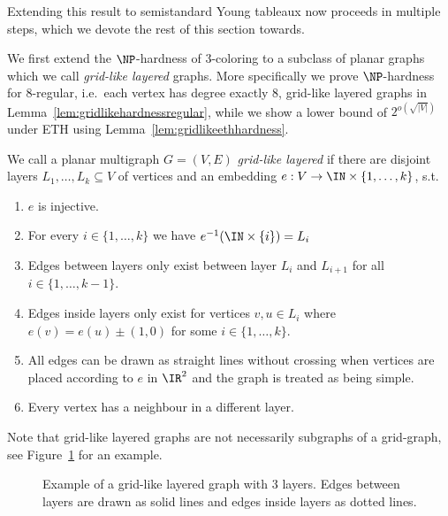 Extending this result to semistandard Young tableaux now proceeds in multiple steps, which we devote the rest of this section towards.

We first extend the $\NP$-hardness of $3$-coloring to a subclass of planar graphs which we call \emph{grid-like layered} graphs.
More specifically we prove $\NP$-hardness for $8$-regular, i.e.\ each vertex has degree exactly $8$, grid-like layered graphs in Lemma~\ref{lem:gridlikehardnessregular}, while we show a lower bound of $2^{o\left(\sqrt{|V|}\right)}$ under ETH using Lemma~\ref{lem:gridlikeethhardness}.
\enlargethispage{2ex}
\begin{definition}
    \label{def:gridlike}
    We call a planar multigraph $G = (V, E)$ \emph{grid-like layered} if there are disjoint layers $L_1, \ldots, L_k \subseteq V$ of vertices and an embedding $e: V \to \IN \times \{1,\ldots,k\}$, s.t.
    \begin{enumerate}
        \item $e$ is injective.
        \item For every $i \in \{1, \ldots, k\}$ we have $e^{-1}(\IN \times \{i\}) = L_i$
        \item Edges between layers only exist between layer $L_i$ and $L_{i+1}$ for all $i \in \{1, \ldots, k-1\}$.
        \item Edges inside layers only exist for vertices $v, u \in L_i$ where $e(v) = e(u) \pm (1,0)$ for some $i \in \{1, \ldots, k\}$.\label{itm:gridlikeeasylayer}
        \item All edges can be drawn as straight lines without crossing when vertices are placed according to $e$ in $\IR^2$ and the graph is treated as being simple.\label{itm:gridlikestraightplanar}
        \item Every vertex has a neighbour in a different layer.\label{itm:gridlikeneighbours}
    \end{enumerate}
\end{definition}
Note that grid-like layered graphs are not necessarily subgraphs of a grid-graph, see Figure~\ref{fig:gridlikeexample} for an example.
\begin{figure}[tpb]
    \centering
    \caption{Example of a grid-like layered graph with $3$ layers. Edges between layers are drawn as solid lines and edges inside layers as dotted lines.}
    \label{fig:gridlikeexample}
\end{figure}
